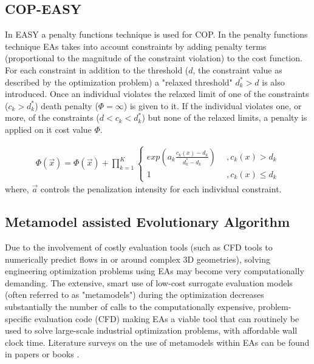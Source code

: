 \subsection{COP-EASY}
\label{COP}
In EASY a penalty functions technique is used for COP. In the penalty functions technique EAs takes into account constraints by adding penalty terms (proportional to the magnitude of the constraint violation) to the cost function. For each constraint in addition to the threshold ($d$, the constraint value as described by the optimization problem) a "relaxed threshold" $d_k^* > d$ is also introduced. Once an individual violates the relaxed limit of one of the constraints ($c_k>d_k^*$) death penalty ($\Phi = \infty$) is given to it. If the individual violates one, or more, of the constraints ($d<c_k<d_k^*$) but none of the relaxed limits, a penalty is applied on it cost value $\Phi$. 

\begin{eqnarray}
	\Phi(\vec{x})=\Phi(\vec{x})+ \prod _{k=1}^K{\left\{ 				\begin{array}{ll}
    exp(a_k\frac{c_k(x)-d_k}{d_k^* -d_k}) & ~~,c_k(x)>d_k\\
    1 & ~~,c_k(x)\leq d_k\end{array} \right. }
    \label{penal2}
\end{eqnarray}  
where, $\vec{a}$ controls the penalization intensity for each individual constraint.

 

\subsection{Metamodel assisted Evolutionary Algorithm}
\label{MAEApar}
Due to the involvement of costly evaluation tools (such as CFD tools to numerically predict flows in or around complex 3D geometries), solving engineering optimization problems using EAs may become very computationally demanding. The extensive, smart use of low-cost surrogate evaluation models (often referred to as "metamodels") during the optimization decreases substantially the number of calls to the computationally expensive, problem-specific evaluation code (CFD) making EAs a viable tool that can routinely be used to solve large-scale industrial optimization problems, with affordable wall clock time. Literature surveys on the use of metamodels within EAs can be found in papers \cite{LTT_2_020,Jin2002,LTT_2_027} or books \cite{KEANEbook}.


